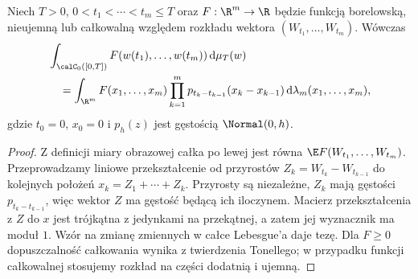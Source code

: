 \begin{twierdzenie}
Niech $T>0$, $0<t_1<\cdots<t_m\le T$ oraz
$F:\R^m\to\R$ będzie funkcją borelowską, nieujemną
lub całkowalną względem rozkładu wektora
$(W_{t_1},\ldots,W_{t_m})$. Wówczas
\begin{align*}
&\int_{\calC_0([0,T])}F(w(t_1),\ldots,w(t_m))\,\mathrm d\mu_T(w)\\
&\quad=\int_{\R^m}F(x_1,\ldots,x_m)
\prod_{k=1}^m p_{t_k-t_{k-1}}(x_k-x_{k-1})
\,\mathrm d\lambda_m(x_1,\ldots,x_m),
\end{align*}
gdzie $t_0=0$, $x_0=0$ i $p_h(z)$ jest gęstością
$\Normal(0,h)$.
\end{twierdzenie}
\begin{proof}
Z definicji miary obrazowej całka po lewej jest równa
$\E F(W_{t_1},\ldots,W_{t_m})$.
Przeprowadzamy liniowe przekształcenie od przyrostów
$Z_k=W_{t_k}-W_{t_{k-1}}$ do kolejnych położeń
$x_k=Z_1+\cdots+Z_k$.
Przyrosty są niezależne, $Z_k$ mają gęstości
$p_{t_k-t_{k-1}}$, więc wektor $Z$ ma gęstość
będącą ich iloczynem. Macierz przekształcenia z $Z$
do $x$ jest trójkątna z jedynkami na przekątnej,
a zatem jej wyznacznik ma moduł $1$.
Wzór na zmianę zmiennych w całce Lebesgue'a
daje tezę. Dla $F\ge0$ dopuszczalność całkowania
wynika z twierdzenia Tonellego; w przypadku funkcji
całkowalnej stosujemy rozkład na części dodatnią i ujemną.
\end{proof}

